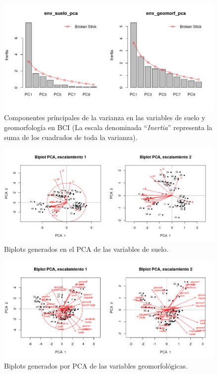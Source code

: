 \documentclass[11pt,]{article}
\begin{document}
\begin{figure}
\centering
\includegraphics{env_suelo_geomorf_pca_br_stick.png}
\caption{Componentes príncipales de la varianza en las variables de
suelo y geomorfología en BCI (La escala denominada ``\emph{Inertia}''
representa la suma de los cuadrados de toda la varianza).
\label{fig:pca_suelo_geomorf_br_stick}}
\end{figure}

\begin{figure}
\centering
\includegraphics{pca_biplot_suelo.png}
\caption{Biplots generados en el PCA de las variables de suelo.
\label{fig:pca_biplot_suelo}}
\end{figure}

\begin{figure}
\centering
\includegraphics{pca_biplot_geomorf.png}
\caption{Biplots generados por PCA de las variables geomorfológicas.
\label{fig:pca_biplot_geomorf}}
\end{figure}
\end{document}
